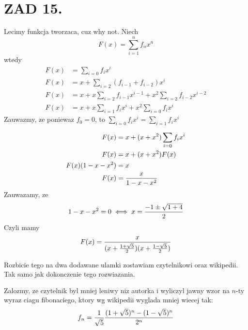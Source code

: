 \documentclass{article}[13pt]
\begin{document}
    \newpage


    \section*{ZAD 15.}

    Lecimy funkcja tworzaca, cuz why not. Niech
    $$F(x)=\sum\limits_{i=1}^nf_nx^n$$
    wtedy
    \begin{align*}
        F(x)&=\sum\limits_{i=0}f_ix^i\\
        F(x)&=x+\sum\limits_{i=2}(f_{i-1}+f_{i-2})x^i\\
        F(x)&=x+x\sum\limits_{i=2}f_{i-1}x^{i-1}+x^2\sum\limits_{i=2}f_{i-2}x^{i-2}\\
        F(x)&=x+x\sum\limits_{i=1}f_ix^i+x^2\sum\limits_{i=0}f_ix^i
    \end{align*}
    Zauwazmy, ze poniewaz $f_0=0$, to $\sum\limits_{i=0}f_ix^i=\sum\limits_{i=1}f_ix^i$

    \begin{align*}
        F(x)&=x+(x+x^2)\sum\limits_{i=0}f_ix^i\\
        F(x)&=x+(x+x^2)F(x)\\
        F(x)(1-x-x^2)&=x\\
        F(x)&={x\over 1-x-x^2}
    \end{align*}
    Zauwazamy, ze 
    $$1-x-x^2=0\iff x={-1\pm\sqrt{1+4}\over 2}$$
    Czyli mamy
    $$F(x)={x\over (x+{1+\sqrt5\over 2})(x+{1-\sqrt5\over 2})}$$

    Rozbicie tego na dwa dodawane ulamki zostawiam czytelnikowi oraz wikipedii. Tak samo jak dokonczenie tego rozwiazania.
    \medskip

    Zalozmy, ze czytelnik byl mniej leniwy niz autorka i wyliczyl jawny wzor na $n$-ty wyraz ciagu fibonaciego, ktory wg wikipedii wyglada mniej wiecej tak:
    $$f_n=\frac1{\sqrt5}{(1+\sqrt5)^n-(1-\sqrt5)^n\over 2^n}$$
\end{document}
